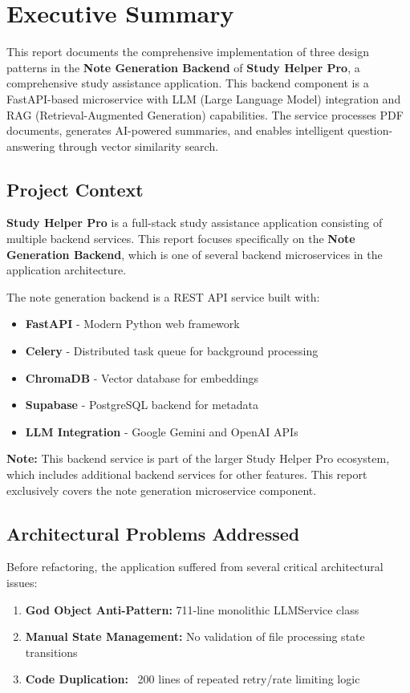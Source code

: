 \documentclass[11pt,a4paper]{article}
\begin{document}
\section{Executive Summary}

This report documents the comprehensive implementation of three design patterns in the \textbf{Note Generation Backend} of \textbf{Study Helper Pro}, a comprehensive study assistance application. This backend component is a FastAPI-based microservice with LLM (Large Language Model) integration and RAG (Retrieval-Augmented Generation) capabilities. The service processes PDF documents, generates AI-powered summaries, and enables intelligent question-answering through vector similarity search.

\subsection{Project Context}

\textbf{Study Helper Pro} is a full-stack study assistance application consisting of multiple backend services. This report focuses specifically on the \textbf{Note Generation Backend}, which is one of several backend microservices in the application architecture.

The note generation backend is a REST API service built with:
\begin{itemize}
    \item \textbf{FastAPI} - Modern Python web framework
    \item \textbf{Celery} - Distributed task queue for background processing
    \item \textbf{ChromaDB} - Vector database for embeddings
    \item \textbf{Supabase} - PostgreSQL backend for metadata
    \item \textbf{LLM Integration} - Google Gemini and OpenAI APIs
\end{itemize}

\textbf{Note:} This backend service is part of the larger Study Helper Pro ecosystem, which includes additional backend services for other features. This report exclusively covers the note generation microservice component.

\subsection{Architectural Problems Addressed}

Before refactoring, the application suffered from several critical architectural issues:
\begin{enumerate}
    \item \textbf{God Object Anti-Pattern:} 711-line monolithic LLMService class
    \item \textbf{Manual State Management:} No validation of file processing state transitions
    \item \textbf{Code Duplication:} ~200 lines of repeated retry/rate limiting logic
\end{enumerate}
\end{document}
